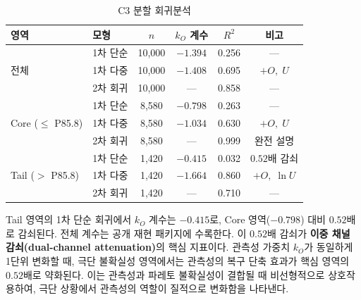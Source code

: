 \begin{table}[htbp]
  \centering
  \caption{C3 분할 회귀분석 }
  \label{tab:c3_split_regression}
  \begin{tabular}{llcccc}
    \toprule
    영역 & 모형 & $n$ & $k_O$ 계수 & $R^2$ & 비고 \\
    \midrule
    \multirow{3}{*}{전체}
      & 1차 단순 & 10{,}000 & $-1.394$ & 0.256 & --- \\
      & 1차 다중 & 10{,}000 & $-1.408$ & 0.695 & $+O,\;U$ \\
      & 2차 회귀 & 10{,}000 & --- & 0.858 & --- \\
    \midrule
    \multirow{3}{*}{Core ($\leq$ P85.8)}
      & 1차 단순 & 8{,}580 & $-0.798$ & 0.263 & --- \\
      & 1차 다중 & 8{,}580 & $-1.034$ & 0.630 & $+O,\;U$ \\
      & 2차 회귀 & 8{,}580 & --- & 0.999 & 완전 설명 \\
    \midrule
    \multirow{3}{*}{Tail ($>$ P85.8)}
      & 1차 단순 & 1{,}420 & $-0.415$ & 0.032 & $0.52$배 감쇠 \\
      & 1차 다중 & 1{,}420 & $-1.664$ & 0.860 & $+O,\;\ln U$ \\
      & 2차 회귀 & 1{,}420 & --- & 0.710 & --- \\
    \bottomrule
  \end{tabular}
\end{table}


Tail 영역의 1차 단순 회귀에서 $k_O$ 계수는 $-0.415$로,
Core 영역($-0.798$) 대비 $0.52$배로 감쇠된다. 전체 계수는 공개 재현 패키지에 수록한다.
이 $0.52$배 감쇠가 \textbf{이중 채널 감쇠(dual-channel attenuation)}의
핵심 지표이다. 관측성 가중치 $k_O$가 동일하게 1단위 변화할 때,
극단 불확실성 영역에서는 관측성의 복구 단축 효과가 핵심 영역의 $0.52$배로 약화된다.
이는 관측성과 파레토 불확실성이 결합될 때 비선형적으로 상호작용하여,
극단 상황에서 관측성의 역할이 질적으로 변화함을 나타낸다.


\subsection{}
\label{subsec:r2_progression}

